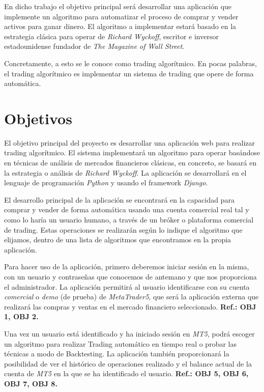En dicho trabajo el objetivo principal será desarrollar una aplicación que implemente un algoritmo para automatizar el proceso de comprar y vender activos para ganar dinero. El algoritmo a implementar estará basado en la estrategia clásica para operar de \textit{Richard Wyckoff}, escritor e inversor estadounidense fundador de \textit{The Magazine of Wall Street}. \newline

Concretamente, a esto se le conoce como trading algorítmico. En pocas palabras, el trading algorítmico es implementar un sistema de trading que opere de forma automática. \newline

	

\section{Objetivos}

El objetivo principal del proyecto es desarrollar una aplicación web para realizar trading algorítmico. El sistema implementará un algoritmo para operar basándose en técnicas de análisis de mercados financieros clásicas, en concreto, se basará en la estrategia o análisis de \textit{Richard Wyckoff}. La aplicación se desarrollará en el lenguaje de programación \textit{Python} y usando el framework \textit{Django}. \newline

El desarrollo principal de la aplicación se encontrará en la capacidad para comprar y vender de forma automática usando una cuenta comercial real tal y como lo haría un usuario humano, a través de un bróker o plataforma comercial de trading. Estas operaciones se realizarán según lo indique el algoritmo que elijamos, dentro de una lista de algoritmos que encontramos en la propia aplicación. \newline

Para hacer uso de la aplicación, primero deberemos iniciar sesión en la misma, con un usuario y contraseñas que conocemos de antemano y que nos proporciona el administrador. La aplicación permitirá al usuario identificarse con su cuenta \textit{comercial} o \textit{demo} (de prueba) de \textit{MetaTrader5}, que será la aplicación externa que realizará las compras y ventas en el mercado financiero seleccionado. \textbf{Ref.: OBJ 1, OBJ 2.} \newline

Una vez un usuario está identificado y ha iniciado sesión en \textit{MT5}, podrá escoger un algoritmo para realizar Trading automático en tiempo real o probar las técnicas a modo de Backtesting. La aplicación también proporcionará la posibilidad de ver el histórico de operaciones realizado y el balance actual de la cuenta de \textit{MT5} en la que se ha identificado el usuario. \textbf{Ref.: OBJ 5, OBJ 6, OBJ 7, OBJ 8.} \newline

